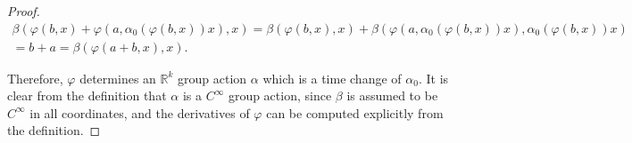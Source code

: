 \documentclass[10pt,a4paper]{amsart}
\newcommand{\R}{\mathbb{R}}
\begin{document}
\begin{proof}
\begin{multline*} \beta(\varphi(b,x) +  \varphi(a,\alpha_0(\varphi(b,x))x),x) = \beta(\varphi(b,x),x) + \beta(\varphi(a,\alpha_0(\varphi(b,x))x),\alpha_0(\varphi(b,x))x) \\ = b + a = \beta(\varphi(a+b,x),x).
\end{multline*}

Therefore, $\varphi$ determines an $\R^k$ group action $\alpha$ which is a time change of $\alpha_0$. It is clear from the definition that $\alpha$ is a $C^\infty$ group action, since $\beta$ is assumed to be $C^\infty$ in all coordinates, and the derivatives of $\varphi$ can be computed explicitly from the definition.
\end{proof}
\end{document}
